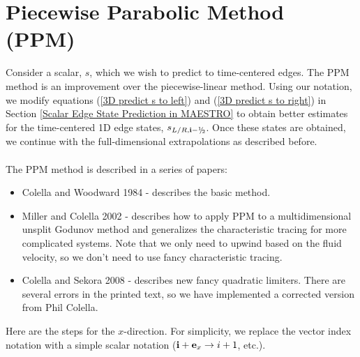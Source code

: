 \newpage

\section{Piecewise Parabolic Method (PPM)}
Consider a scalar, $s$, which we wish to predict to time-centered edges.
The PPM method is an improvement over the piecewise-linear method.
Using our notation, we modify equations (\ref{3D predict s to left}) and 
(\ref{3D predict s to right}) in Section 
\ref{Scalar Edge State Prediction in MAESTRO} to obtain better estimates
for the time-centered 1D edge states, $s_{L/R,\ib-\myhalf}$.  Once these states 
are obtained, we continue with the full-dimensional extrapolations as 
described before.\\ \\
The PPM method is described in a series of papers:
\begin{itemize}
\item Colella and Woodward 1984 - describes the basic method.
\item Miller and Colella 2002 - describes how to apply PPM to a multidimensional
unsplit Godunov method and generalizes the characteristic tracing for more complicated
systems.  Note that we only need to upwind based on the fluid velocity, so we don't
need to use fancy characteristic tracing.
\item Colella and Sekora 2008 - describes new fancy quadratic limiters.  There are
several errors in the printed text, so we have implemented a corrected version from
Phil Colella.
\end{itemize}
Here are the steps for the $x$-direction.  For simplicity, we replace the vector index notation with a simple scalar notation (${\bf i}+{\bf e}_x \rightarrow i+1$, etc.).

